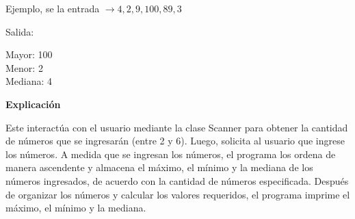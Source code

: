 \documentclass[11pt, twocolumn]{article}
\newcommand{\linejump}{\hfill \break}
\begin{document}
    Ejemplo, se la entrada $\longrightarrow 4 ,2, 9, 100, 89, 3$
    
    \linejump
    Salida:
    
    \linejump
    Mayor: 100 \\
    Menor: 2 \\
    Mediana: 4

    \textbf{Explicación} 

    Este interactúa con el usuario mediante la clase Scanner para obtener la cantidad de números que se ingresarán (entre 2 y 6). Luego, solicita al usuario que ingrese los números. A medida que se ingresan los números, el programa los ordena de manera ascendente y almacena el máximo, el mínimo y la mediana de los números ingresados, de acuerdo con la cantidad de números especificada. Después de organizar los números y calcular los valores requeridos, el programa imprime el máximo, el mínimo y la mediana.
\end{document}
